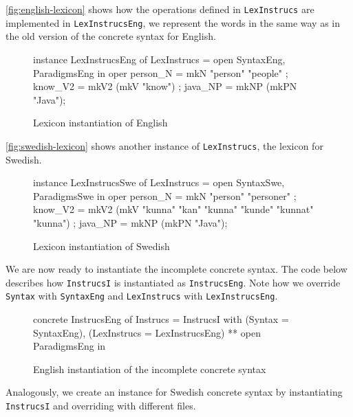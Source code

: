 \autoref{fig:english-lexicon} shows how the operations defined in \texttt{LexInstrucs} are implemented in \texttt{LexInstrucsEng}, we represent the words in the same  way as in the old version of the concrete syntax for English.

\begin{figure}[H]
\begin{code}
instance LexInstrucsEng of LexInstrucs = open SyntaxEng, ParadigmsEng in {
    oper
      person_N = mkN "person" "people" ;
      know_V2 = mkV2 (mkV "know") ;	  
      java_NP = mkNP (mkPN "Java");
}
\end{code}
\caption{Lexicon instantiation of English \label{fig:english-lexicon}}
\end{figure}

\autoref{fig:swedish-lexicon} shows another instance of \texttt{LexInstrucs}, the lexicon for Swedish.

\begin{figure}[H]
\begin{code}
instance LexInstrucsSwe of LexInstrucs = open SyntaxSwe, ParadigmsSwe in {
    oper
      person_N = mkN "person" "personer" ;
      know_V2 = mkV2 (mkV "kunna" "kan" "kunna" "kunde" "kunnat" "kunna") ;	  
      java_NP = mkNP (mkPN "Java");
}
\end{code}
\caption{Lexicon instantiation of Swedish\label{fig:swedish-lexicon}}
\end{figure}

We are now ready to instantiate the incomplete concrete syntax. The code below describes how \texttt{InstrucsI} is instantiated as \texttt{InstrucsEng}. Note how we override \texttt{Syntax} with \texttt{SyntaxEng} and \texttt{LexInstrucs} with \texttt{LexInstrucsEng}.

\begin{figure}[H]
\begin{code}
concrete InstrucsEng of Instrucs = InstrucsI with 
                                         (Syntax = SyntaxEng), 
                                         (LexInstrucs = LexInstrucsEng) 
                                         ** open ParadigmsEng in {}
\end{code}
\caption{English instantiation of the incomplete concrete syntax}
\end{figure}

Analogously, we create an instance for Swedish concrete syntax by instantiating \texttt{InstrucsI} and overriding with different files.

